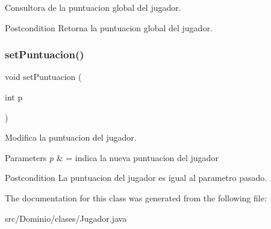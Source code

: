 Consultora de la puntuacion global del jugador. 

\begin{DoxyPostcond}{Postcondition}
Retorna la puntuacion global del jugador. 
\end{DoxyPostcond}
\mbox{\label{class_dominio_1_1clases_1_1_jugador_a89fba99d8b6ec552abd40645ff1efede}} 
\subsubsection{set\+Puntuacion()}
{\footnotesize\ttfamily void set\+Puntuacion (\begin{DoxyParamCaption}\item[{int}]{p }\end{DoxyParamCaption})\hspace{0.3cm}{\ttfamily [inline]}}



Modifica la puntuacion del jugador. 


\begin{DoxyParams}{Parameters}
{\em p} & = indica la nueva puntuacion del jugador \\
\hline
\end{DoxyParams}
\begin{DoxyPostcond}{Postcondition}
La puntuacion del jugador es igual al parametro pasado. 
\end{DoxyPostcond}


The documentation for this class was generated from the following file\+:\begin{DoxyCompactItemize}
\item 
src/\+Dominio/clases/Jugador.\+java\end{DoxyCompactItemize}
